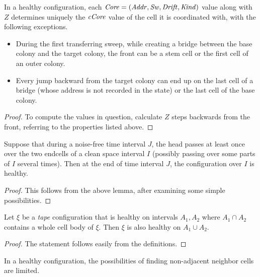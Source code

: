 \documentclass[12pt]{memoir}
\newcommand{\authnote}[3]
{\text{{ \textcolor{#3}{\( \langle\hspace{-0.2em}\langle \)\textsf{\footnotesize #1: #2}\( \rangle\hspace{-0.2em}\rangle \)}}}}
\newcommand{\authnote}[2]{}
\newcommand{\Pnote}[1]{{\authnote{P}{#1}{cyan}}}
\newcommand{\fld}[1]{\ensuremath{\textit{#1\/}}}
\newcommand{\Z}{Z}
\newcommand{\Addr}{\fld{Addr}}
\newcommand{\Core}{\fld{Core}}
\newcommand{\cCore}{\fld{cCore}}
\newcommand{\Drift}{\fld{Drift}}
\newcommand{\Kind}{\fld{Kind}}
\newcommand{\Sweep}{\fld{Sw}}
\begin{document}
\begin{lemma}\label{lem:coordination1}
  In a healthy configuration, each \( \Core =(\Addr, \Sweep, \Drift, \Kind) \) 
  value along with \( \Z \) determines uniquely the 
  \( \cCore \) value of the cell it is coordinated with, with the following exceptions.
  \begin{itemize}
  \item During the first transferring sweep, while
    creating a bridge between the base colony and the target colony, 
    the front can be a stem cell or the first cell of an outer colony.
  \item Every jump backward from the target colony can end up on the last cell of a 
    bridge (whose address is not recorded in the state) or the last cell of the base colony.
  \end{itemize}
  \end{lemma}
  \begin{proof}
  To compute the values in question, calculate \( \Z \) steps backwards from the front,
  referring to the properties listed above.
\Pnote{Elaborate!}    
  \end{proof}

  \begin{lemma}\label{lem:coordination2}
    Suppose that during a noise-free time interval \( J \), the head passes at least once over the two
endcells of a clean space interval \( I \) (possibly passing over some 
parts of \( I \) several times).
Then at the end of time interval \( J \), the configuration over \( I \) is healthy.
  \end{lemma}
  \begin{proof}
    This follows from the above lemma, after examining some simple possibilities.
\Pnote{Elaborate!}
  \end{proof}

\begin{lemma}\label{lem:health-extension}
  Let \( \xi \) be a \emph{tape} configuration that is healthy on intervals \( A_{1}, A_{2} \) 
where \( A_{1}\cap A_{2} \) contains a whole cell body of \( \xi \).
Then \( \xi \) is also healthy on \( A_{1}\cup A_{2} \).
\end{lemma}
\begin{proof}
  The statement follows easily from the definitions.
\end{proof}

In a healthy configuration, the possibilities of finding non-adjacent neighbor
cells are limited.
\end{document}
